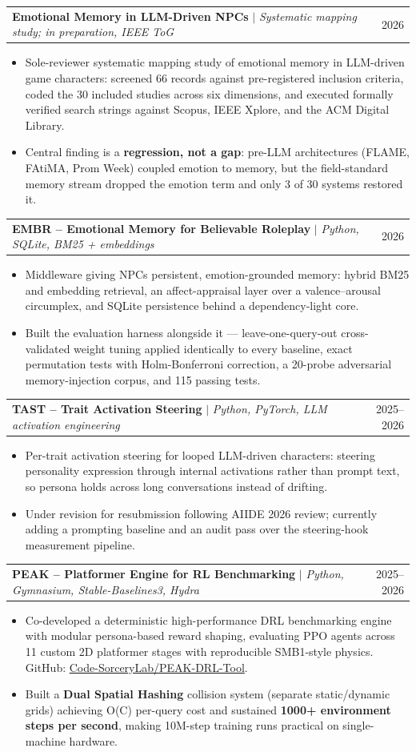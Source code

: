 \documentclass[letterpaper,10pt]{article}
\makeatletter
\newcommand{\resumeItem}[1]{
  \item\small{
    {#1 \vspace{-2pt}}
  }
}
\newcommand{\resumeProjectHeading}[2]{
    \item
    \begin{tabular*}{0.98\textwidth}{l@{\extracolsep{\fill}}r}
      \small#1 & #2 \\
    \end{tabular*}\vspace{-5pt}
}
\newcommand{\resumeItemListStart}{\begin{itemize}}
\newcommand{\resumeItemListEnd}{\end{itemize}\vspace{-5pt}}
\makeatother
\begin{document}
      \resumeProjectHeading
          {\textbf{Emotional Memory in LLM-Driven NPCs} $|$ \emph{Systematic mapping study; in preparation, IEEE ToG}}{2026}
          \resumeItemListStart
            \resumeItem{Sole-reviewer systematic mapping study of emotional memory in LLM-driven game characters: screened 66 records against pre-registered inclusion criteria, coded the 30 included studies across six dimensions, and executed formally verified search strings against Scopus, IEEE Xplore, and the ACM Digital Library.}
            \resumeItem{Central finding is a \textbf{regression, not a gap}: pre-LLM architectures (FLAME, FAtiMA, Prom Week) coupled emotion to memory, but the field-standard memory stream dropped the emotion term and only 3 of 30 systems restored it.}
          \resumeItemListEnd

      \resumeProjectHeading
          {\textbf{EMBR -- Emotional Memory for Believable Roleplay} $|$ \emph{Python, SQLite, BM25 + embeddings}}{2026}
          \resumeItemListStart
            \resumeItem{Middleware giving NPCs persistent, emotion-grounded memory: hybrid BM25 and embedding retrieval, an affect-appraisal layer over a valence--arousal circumplex, and SQLite persistence behind a dependency-light core.}
            \resumeItem{Built the evaluation harness alongside it --- leave-one-query-out cross-validated weight tuning applied identically to every baseline, exact permutation tests with Holm-Bonferroni correction, a 20-probe adversarial memory-injection corpus, and 115 passing tests.}
          \resumeItemListEnd

      \resumeProjectHeading
          {\textbf{TAST -- Trait Activation Steering} $|$ \emph{Python, PyTorch, LLM activation engineering}}{2025--2026}
          \resumeItemListStart
            \resumeItem{Per-trait activation steering for looped LLM-driven characters: steering personality expression through internal activations rather than prompt text, so persona holds across long conversations instead of drifting.}
            \resumeItem{Under revision for resubmission following AIIDE 2026 review; currently adding a prompting baseline and an audit pass over the steering-hook measurement pipeline.}
          \resumeItemListEnd

      \resumeProjectHeading
          {\textbf{PEAK -- Platformer Engine for RL Benchmarking} $|$ \emph{Python, Gymnasium, Stable-Baselines3, Hydra}}{2025--2026}
          \resumeItemListStart
            \resumeItem{Co-developed a deterministic high-performance DRL benchmarking engine with modular persona-based reward shaping, evaluating PPO agents across 11 custom 2D platformer stages with reproducible SMB1-style physics. GitHub: \href{https://github.com/Code-SorceryLab/PEAK-DRL-Tool}{Code-SorceryLab/PEAK-DRL-Tool}.}
            \resumeItem{Built a \textbf{Dual Spatial Hashing} collision system (separate static/dynamic grids) achieving O(C) per-query cost and sustained \textbf{1000+ environment steps per second}, making 10M-step training runs practical on single-machine hardware.}
          \resumeItemListEnd
\end{document}
